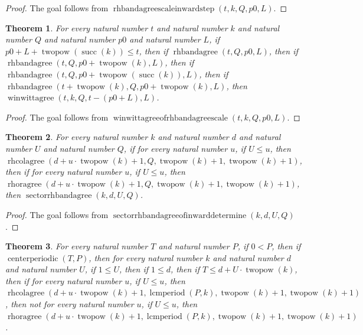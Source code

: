 \documentclass[11pt]{article}
\newtheorem{theorem}{Theorem}[section]
\theoremstyle{definition}
\begin{document}
\begin{proof}
The goal follows from \(\operatorname{rhbandagreescaleinwardstep}(t, k, Q, p0, L)\).
\end{proof}
\begin{theorem}
\label{ll:paper:winwittagree-of-rhbandagree-scale}
For every natural number \(t\) and natural number \(k\) and natural number \(Q\) and natural number \(p0\) and natural number \(L\), if \(p0 + L + \operatorname{twopow}(\operatorname{succ}(k)) \le t\), then if \(\operatorname{rhbandagree}(t, Q, p0, L)\), then if \(\operatorname{rhbandagree}(t, Q, p0 + \operatorname{twopow}(k), L)\), then if \(\operatorname{rhbandagree}(t, Q, p0 + \operatorname{twopow}(\operatorname{succ}(k)), L)\), then if \(\operatorname{rhbandagree}(t + \operatorname{twopow}(k), Q, p0 + \operatorname{twopow}(k), L)\), then \(\operatorname{winwittagree}(t, k, Q, t - (p0 + L), L)\).
\end{theorem}
\begin{proof}
The goal follows from \(\operatorname{winwittagreeofrhbandagreescale}(t, k, Q, p0, L)\).
\end{proof}
\begin{theorem}
\label{ll:paper:sectorrhbandagree-of-inward-determine}
For every natural number \(k\) and natural number \(d\) and natural number \(U\) and natural number \(Q\), if for every natural number \(u\), if \(U \le u\), then \(\operatorname{rhcolagree}(d + u \cdot \operatorname{twopow}(k) + 1, Q, \operatorname{twopow}(k) + 1, \operatorname{twopow}(k) + 1)\), then if for every natural number \(u\), if \(U \le u\), then \(\operatorname{rhoragree}(d + u \cdot \operatorname{twopow}(k) + 1, Q, \operatorname{twopow}(k) + 1, \operatorname{twopow}(k) + 1)\), then \(\operatorname{sectorrhbandagree}(k, d, U, Q)\).
\end{theorem}
\begin{proof}
The goal follows from \(\operatorname{sectorrhbandagreeofinwarddetermine}(k, d, U, Q)\).
\end{proof}
\begin{theorem}
\label{ll:paper:not-sector-inward-determine-lcmperiod}
For every natural number \(T\) and natural number \(P\), if \(0 < P\), then if \(\operatorname{centerperiodic}(T, P)\), then for every natural number \(k\) and natural number \(d\) and natural number \(U\), if \(1 \le U\), then if \(1 \le d\), then if \(T \le d + U \cdot \operatorname{twopow}(k)\), then if for every natural number \(u\), if \(U \le u\), then \(\operatorname{rhcolagree}(d + u \cdot \operatorname{twopow}(k) + 1, \operatorname{lcmperiod}(P, k), \operatorname{twopow}(k) + 1, \operatorname{twopow}(k) + 1)\), then not for every natural number \(u\), if \(U \le u\), then \(\operatorname{rhoragree}(d + u \cdot \operatorname{twopow}(k) + 1, \operatorname{lcmperiod}(P, k), \operatorname{twopow}(k) + 1, \operatorname{twopow}(k) + 1)\).
\end{theorem}
\end{document}
